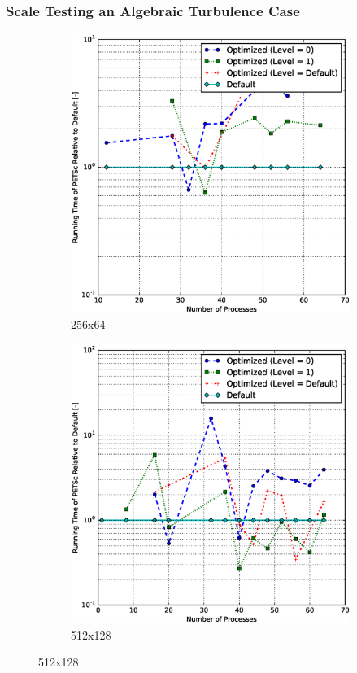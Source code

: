 \documentclass[11pt]{beamer}
\begin{document}
\begin{frame}
  \frametitle{Scale Testing an Algebraic Turbulence Case}
  \begin{figure}[h]
    \centering
    \begin{subfigure}{0.45\textwidth}
      \includegraphics[width=\textwidth]{petsc/algebraic-256x64}
      \caption{256x64}
    \end{subfigure}
    \hfill
    \begin{subfigure}{0.45\textwidth}
      \includegraphics[width=\textwidth]{petsc/algebraic-512x128}
      \caption{512x128}
    \end{subfigure}
  \end{figure}
\end{frame}
\end{document}
